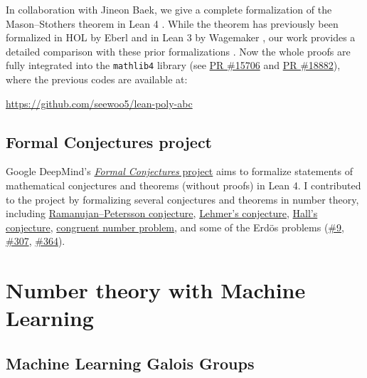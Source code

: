 \documentclass[letterpaper, 10pt]{article}
\begin{document}
In collaboration with Jineon Baek, we give a complete formalization of the Mason--Stothers theorem in Lean 4 \cite{baek2024formalizing}.
While the theorem has previously been formalized in HOL by Eberl \cite{eberl17} and in Lean 3 by Wagemaker \cite{wagemaker18}, our work provides a detailed comparison with these prior formalizations \cite[Section 7]{baek2024formalizing}.
Now the whole proofs are fully integrated into the \texttt{mathlib4} library (see \href{https://github.com/leanprover-community/mathlib4/pull/15706}{PR \#15706} and \href{https://github.com/leanprover-community/mathlib4/pull/18882}{PR \#18882}), where the previous codes are available at:
\begin{center} \href{https://github.com/seewoo5/lean-poly-abc}{https://github.com/seewoo5/lean-poly-abc} \end{center}

\subsection{Formal Conjectures project}

Google DeepMind's \href{https://github.com/google-deepmind/formal-conjectures}{\emph{Formal Conjectures} project} aims to formalize statements of mathematical conjectures and theorems (without proofs) in Lean 4.
I contributed to the project by formalizing several conjectures and theorems in number theory, including \href{https://github.com/google-deepmind/formal-conjectures/pull/119}{Ramanujan--Petersson conjecture}, \href{https://github.com/google-deepmind/formal-conjectures/pull/139}{Lehmer's conjecture}, \href{https://github.com/google-deepmind/formal-conjectures/issues/184}{Hall's conjecture}, \href{https://github.com/google-deepmind/formal-conjectures/pull/317}{congruent number problem}, and some of the Erd\"os problems (\href{https://github.com/google-deepmind/formal-conjectures/pull/300}{\#9}, \href{https://github.com/google-deepmind/formal-conjectures/pull/301}{\#307}, \href{https://github.com/google-deepmind/formal-conjectures/pull/449}{\#364}).


\section{Number theory with Machine Learning}

\subsection{Machine Learning Galois Groups}
\end{document}
